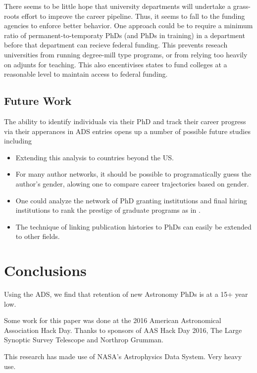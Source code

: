 \documentclass{emulateapj}
\begin{document}
There seems to be little hope that university departments will undertake a grass-roots effort to improve the career pipeline. Thus, it seems to fall to the funding agencies to enforce better behavior.  One approach could be to require a minimum ratio of permanent-to-temporaty PhDs (and PhDs in training) in a department before that department can recieve federal funding.  This prevents reseach universities from running degree-mill type programs, or from relying too heavily on adjunts for teaching.  This also encentivises states to fund colleges at a reasonable level to maintain access to federal funding.  


\subsection{Future Work}

The ability to identify individuals via their PhD and track their career progress via their apperances in ADS entries opens up a number of possible future studies including
\begin{itemize}
\item{Extending this analysis to countries beyond the US.}
\item{For many author networks, it should be possible to programatically guess the author's gender, alowing one to compare career trajectories based on gender.}
\item{One could analyze the network of PhD granting institutions and final hiring institutions to rank the prestige of graduate programs as in \citet{Clauset15}.}
\item{The technique of linking publication histories to PhDs can easily be extended to other fields.}
\end{itemize}

\section{Conclusions}
Using the ADS, we find that retention of new Astronomy PhDs is at a 15+ year low.  


\acknowledgments
Some work for this paper was done at the 2016 American Astronomical Association Hack Day. Thanks to sponsors of AAS Hack Day 2016, The Large Synoptic Survey Telescope and Northrop Grumman.

This research has made use of NASA's Astrophysics Data System. Very heavy use.


\end{document}
